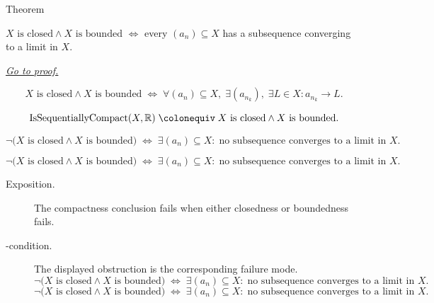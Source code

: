 \begin{theorembox}{Theorem}
\begin{theorem}
\label{thm:heine-borel-subsets-real-line}
$X\text{ is closed} \wedge X\text{ is bounded}$
$\iff$ every $(a_n)\subseteq X$ has a subsequence converging to
a limit in $X$.

\smallskip\noindent
\hyperref[prf:heine-borel-subsets-real-line]{\textit{Go to proof.}}
\end{theorem}
\end{theorembox}

\begin{remark*}
\[
  X\text{ is closed} \wedge X\text{ is bounded}
  \;\iff\;
  \forall (a_n)\subseteq X,\;
  \exists (a_{n_k}),\;\exists L\in X : a_{n_k}\to L.
\]
\end{remark*}

\begin{remark*}
\[
  \operatorname{IsSequentiallyCompact}(X,\mathbb{R})
  \;\colonequiv\;
  X\text{ is closed} \wedge X\text{ is bounded}.
\]
\end{remark*}

\begin{remark*}
\[
  \neg\bigl(X\text{ is closed}\wedge X\text{ is bounded}\bigr)
  \;\iff\;
  \exists (a_n)\subseteq X:\;
  \text{no subsequence converges to a limit in } X.
\]
\end{remark*}

\begin{remark*}
\[
  \neg\bigl(X\text{ is closed}\wedge X\text{ is bounded}\bigr)
  \;\iff\;
  \exists (a_n)\subseteq X:\;
  \text{no subsequence converges to a limit in } X.
\]
\end{remark*}



\begin{remark*}
\begin{description}
  \item[Exposition.]
The compactness conclusion fails when either closedness or boundedness fails.


  \item[\exists-condition.]
  The displayed obstruction is the corresponding failure mode.
  \[
  \neg\bigl(X\text{ is closed}\wedge X\text{ is bounded}\bigr)
  \;\iff\;
  \exists (a_n)\subseteq X:\;
  \text{no subsequence converges to a limit in } X.
\]
  \[
  \neg\bigl(X\text{ is closed}\wedge X\text{ is bounded}\bigr)
  \;\iff\;
  \exists (a_n)\subseteq X:\;
  \text{no subsequence converges to a limit in } X.
\]
\end{description}
\end{remark*}

